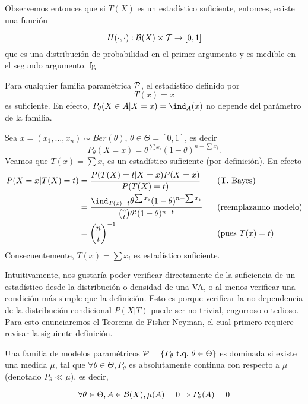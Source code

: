 Observemos entonces que si $T(X)$ es un estadístico suficiente, entonces, existe una función 

\begin{equation}
	H(\cdot,\cdot): {\mathcal B}(X)\times{\mathcal T} \rightarrow [0,1]
\end{equation}
que es una distribución de probabilidad en el primer argumento y es medible en el segundo argumento. 
fg
\begin{example}
	\label{ex:suficiencia_trivial}
	Para cualquier familia paramétrica ${\mathcal P}$, el estadístico definido por
	\begin{equation}
		T(x) = x
	\end{equation}
es suficiente. En efecto, $P_\theta(X\in A|X=x) = \ind_{A}(x)$ no depende del parámetro de la familia. 
\end{example}

\begin{example}
	Sea $x=(x_1,\ldots,x_n) \sim Ber(\theta)$, $\theta \in \Theta = [0,1]$, es decir
	\begin{equation}
		P_\theta(X=x) = \theta^{\sum x_i}(1-\theta)^{n-\sum x_i}.
	\end{equation}
	Veamos que $T(x) = \sum x_i$ es un estadístico suficiente (por definición). En efecto
	\begin{alignat*}{3}
		P(X=x|T(X)=t) 	&= \frac{P(T(X)=t| X=x )P( X=x )}{P(T(X)=t)} \quad&&\text{(T. Bayes)}\\
						&= \frac{\ind_{T(x)=t}\theta^{\sum x_i}(1-\theta)^{n-\sum x_i}}{\binom{n}{t}\theta^t(1-\theta)^{n-t}} &&\text{(reemplazando modelo)}\\
						&= \binom{n}{t}^{-1} && \text{(pues $T(x)=t$)}
	\end{alignat*}
	Consecuentemente, $T(x)=\sum x_i$ es estadístico suficiente.
\end{example}

Intuitivamente, nos gustaría poder verificar directamente de la suficiencia de un estadístico desde la distribución o densidad de una VA, o al menos verificar una condición más simple que la definición. Esto es porque verificar la no-dependencia de la distribución condicional $P(X|T)$ puede ser no trivial, engorroso o tedioso. Para esto enunciaremos el Teorema de Fisher-Neyman, el cual primero requiere revisar la siguiente definición. 



\begin{definition}
	Una familia de modelos paramétricos $\mathcal{P} = \{P_\theta\ {\text{t.q.}}\ \theta\in\Theta\}$ es dominada si existe una medida $\mu$, tal que $\forall \theta\in\Theta, P_\theta$ es absolutamente continua con respecto a $\mu$ (denotado $ P_\theta \ll \mu$), es decir, 

	\begin{equation}
		\forall \theta\in\Theta, A\in{\mathcal B}(X), \mu(A)=0 \Rightarrow P_\theta(A) = 0 
	\end{equation}
\end{definition}

